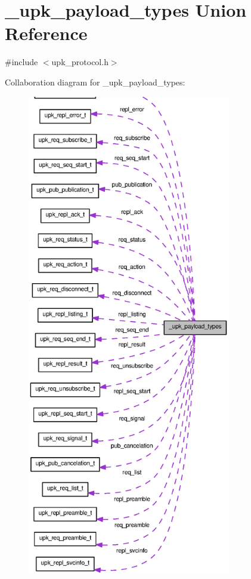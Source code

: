 \section{\_\-upk\_\-payload\_\-types Union Reference}
\label{union__upk__payload__types}


{\ttfamily \#include $<$upk\_\-protocol.h$>$}



Collaboration diagram for \_\-upk\_\-payload\_\-types:\nopagebreak
\begin{figure}[H]
\begin{center}
\leavevmode
\includegraphics[height=600pt]{union__upk__payload__types__coll__graph}
\end{center}
\end{figure}
